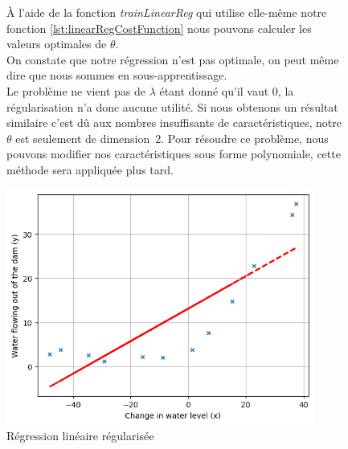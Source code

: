 \begin{figure}[!h]
    \begin{minipage}{.48\linewidth}
        À l'aide de la fonction \textit{trainLinearReg} qui utilise elle-même notre fonction \ref{lst:linearRegCostFunction} nous pouvons calculer les valeurs optimales de $\theta$. \\
        On constate que notre régression n'est pas optimale, on peut même dire que nous sommes en sous-apprentissage. \\
        Le problème ne vient pas de $\lambda$ étant donné qu'il vaut 0, la régularisation n'a donc aucune utilité. 
        Si nous obtenons un résultat similaire c'est dû aux nombres insuffisants de caractéristiques, notre $\theta$ est seulement de dimension~2. Pour résoudre ce problème, nous pouvons modifier nos caractéristiques sous forme polynomiale, cette méthode sera appliquée plus tard.
    \end{minipage}\hfill
    \begin{minipage}{.48\linewidth}
        \begin{center}
            \includegraphics[width=0.9\textwidth]{./img/3.4.png}
            \caption{\label{fig:reg-lin-plot}Régression linéaire régularisée}  
        \end{center}
    \end{minipage}
\end{figure}
